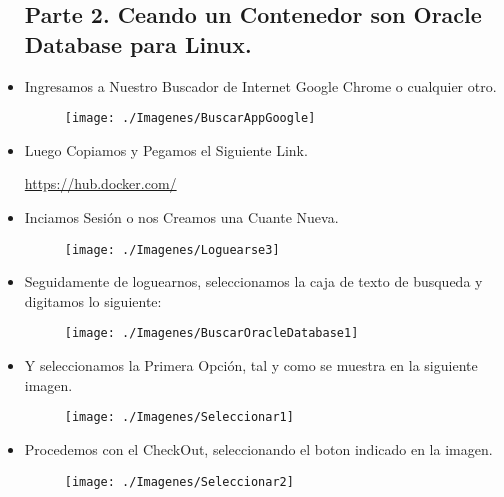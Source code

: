 \begin{itemize}
		\subsection{Parte 2. Ceando un Contenedor son Oracle Database para Linux.}
			\item Ingresamos a Nuestro Buscador de Internet Google Chrome  o cualquier otro.
				\begin{figure}[htb]
					\begin{center}
						\texttt{[image: ./Imagenes/BuscarAppGoogle]}
					\end{center}
				\end{figure}
			\item Luego Copiamos y Pegamos el Siguiente Link.
				\begin{center}
					\url{https://hub.docker.com/}
				\end{center}
				\vspace{7cm}
			\item Inciamos Sesión o nos Creamos una Cuante Nueva.
				\begin{figure}[htb]
					\begin{center}
						\texttt{[image: ./Imagenes/Loguearse3]}
					\end{center}
				\end{figure}				
			\item Seguidamente de loguearnos, seleccionamos la caja de texto de busqueda y digitamos lo siguiente:
				\begin{figure}[htb]
					\begin{center}
						\texttt{[image: ./Imagenes/BuscarOracleDatabase1]}
					\end{center}
				\end{figure}
			\item Y seleccionamos la Primera Opción, tal y como se muestra en la siguiente imagen.
				\begin{figure}[htb]
					\begin{center}
						\texttt{[image: ./Imagenes/Seleccionar1]}
					\end{center}
				\end{figure}
			\item Procedemos con el CheckOut, seleccionando el boton indicado en la imagen.
				\begin{figure}[htb]
					\begin{center}
						\texttt{[image: ./Imagenes/Seleccionar2]}
					\end{center}

\end{figure}
\end{itemize}
